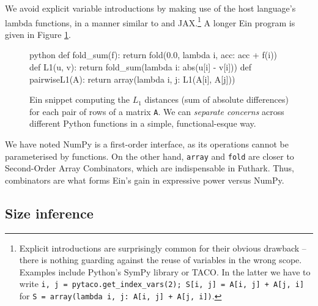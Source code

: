 We avoid explicit variable introductions by making use of the host language's lambda functions, in a manner similar to \textcite{atkey2009unembedding} and JAX.\footnote{Explicit introductions are surprisingly common for their obvious drawback -- there is nothing guarding against the reuse of variables in the wrong scope. Examples include Python's SymPy library or TACO. In the latter we have to write \texttt{i, j = pytaco.get_index_vars(2); S[i, j] = A[i, j] + A[j, i]} for \texttt{S = array(lambda i, j: A[i, j] + A[j, i])}.} A longer Ein program is given in Figure \ref{fig:ein-pairwiseL1}.

\begin{figure}
    \centering
    \begin{cminted}{python}
def fold_sum(f):    return fold(0.0, lambda i, acc: acc + f(i))
def L1(u, v):       return fold_sum(lambda i: abs(u[i] - v[i]))
def pairwiseL1(A):  return array(lambda i, j: L1(A[i], A[j]))
    \end{cminted}
    \caption{Ein snippet computing the $L_1$ distances (sum of absolute differences) for each pair of rows of a matrix \texttt{A}. We can \textit{separate concerns} across different Python functions in a simple, functional-esque way.}
    \label{fig:ein-pairwiseL1}
\end{figure}

We have noted NumPy is a first-order interface, as its operations cannot be parameterised by functions. On the other hand, \texttt{array} and \texttt{fold} are closer to Second-Order Array Combinators, which are indispensable in Futhark.
Thus, combinators are what forms Ein's gain in expressive power versus NumPy.

\subsection{Size inference}

